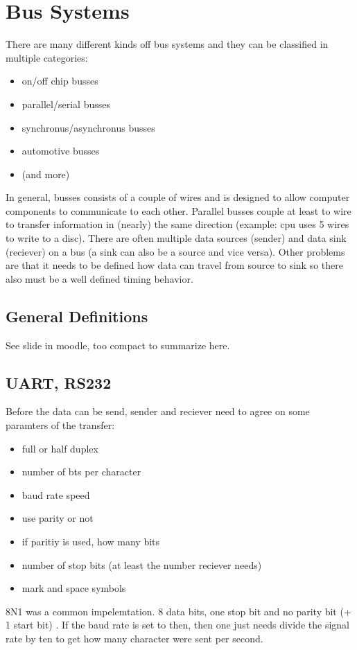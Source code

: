\documentclass[a4paper]{scrartcl}
\begin{document}
    \section{Bus Systems}
        There are many different kinds off bus systems and they can be classified in multiple categories:
        \begin{itemize}
            \item on/off chip busses
            \item parallel/serial busses
            \item synchronus/asynchronus busses 
            \item automotive busses
            \item (and more)
        \end{itemize}
        In general, busses consists of a couple of wires and is designed to allow computer components to communicate to each other. Parallel busses couple at least to 
        wire to transfer information in (nearly) the same direction (example: cpu uses 5 wires to write to a disc). There are often multiple data sources (sender)
        and data sink (reciever) on a bus (a sink can also be a source and vice versa). Other problems are that it needs to be defined how data can travel from source to 
        sink so there also must be a well defined timing behavior.
        \subsection{General Definitions}
            See slide in moodle, too compact to summarize here.
        \subsection{UART, RS232}
            Before the data can be send, sender and reciever need to agree on some paramters of the transfer:
            \begin{itemize}
                \item full or half duplex
                \item number of bts per character
                \item baud rate speed 
                \item use parity or not
                \item if paritiy is used, how many bits
                \item number of stop bits (at least the number reciever needs)
                \item mark and space symbols %
            \end{itemize}
            8N1 was a common impelemtation. 8 data bits, one stop bit and no parity bit (+ 1 start bit)%
            . If the baud rate is set to then, then one just needs 
            divide the signal rate by ten to get how many character were sent per second.  
\end{document}
